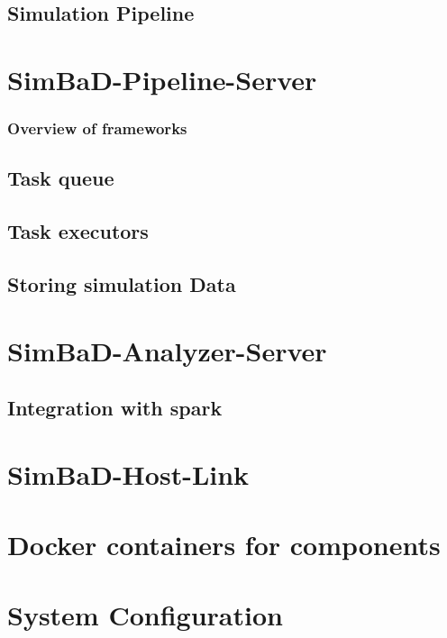 \subsection{Simulation Pipeline}

\section{SimBaD-Pipeline-Server}
\subsubsection{Overview of frameworks}
\subsection{Task queue}
\subsection{Task executors}
\subsection{Storing simulation Data}
\section{SimBaD-Analyzer-Server}
\subsection{Integration with spark}
\section{SimBaD-Host-Link}
\section{Docker containers for components}
\section{System Configuration}